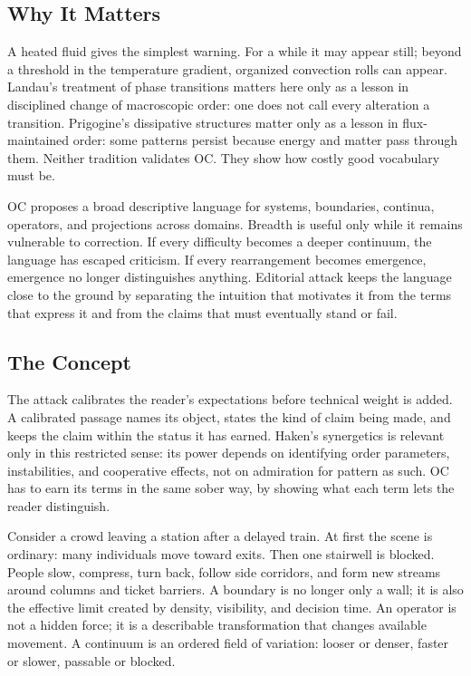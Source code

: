 \documentclass[11pt,a4paper,openany]{book}
\begin{document}
\subsection{Why It Matters}
A heated fluid gives the simplest warning. For a while it may appear still; beyond a threshold in the temperature gradient, organized convection rolls can appear. Landau's treatment of phase transitions matters here only as a lesson in disciplined change of macroscopic order: one does not call every alteration a transition. Prigogine's dissipative structures matter only as a lesson in flux-maintained order: some patterns persist because energy and matter pass through them. Neither tradition validates OC. They show how costly good vocabulary must be. \cite{landau_stat_physics,prigogine_dissipative}\par
OC proposes a broad descriptive language for systems, boundaries, continua, operators, and projections across domains. Breadth is useful only while it remains vulnerable to correction. If every difficulty becomes a deeper continuum, the language has escaped criticism. If every rearrangement becomes emergence, emergence no longer distinguishes anything. Editorial attack keeps the language close to the ground by separating the intuition that motivates it from the terms that express it and from the claims that must eventually stand or fail.\par
\subsection{The Concept}
The attack calibrates the reader's expectations before technical weight is added. A calibrated passage names its object, states the kind of claim being made, and keeps the claim within the status it has earned. Haken's synergetics is relevant only in this restricted sense: its power depends on identifying order parameters, instabilities, and cooperative effects, not on admiration for pattern as such. OC has to earn its terms in the same sober way, by showing what each term lets the reader distinguish. \cite{landau_stat_physics,prigogine_dissipative}\par
Consider a crowd leaving a station after a delayed train. At first the scene is ordinary: many individuals move toward exits. Then one stairwell is blocked. People slow, compress, turn back, follow side corridors, and form new streams around columns and ticket barriers. A boundary is no longer only a wall; it is also the effective limit created by density, visibility, and decision time. An operator is not a hidden force; it is a describable transformation that changes available movement. A continuum is an ordered field of variation: looser or denser, faster or slower, passable or blocked.\par
\end{document}

